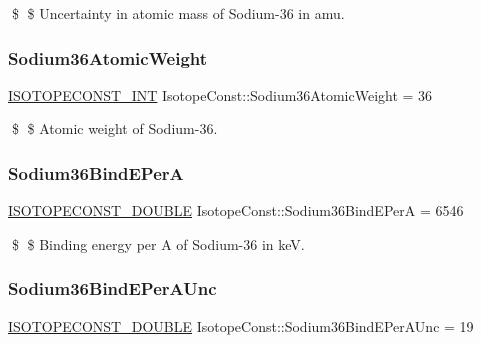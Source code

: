 \$ \$ Uncertainty in atomic mass of Sodium-\/36 in amu. \mbox{\label{group___isotope_const-_sodium-_na36_ga6f922378ca8fc5c8ec384ea5cf5f35aa}} 
\subsubsection{\texorpdfstring{Sodium36\+Atomic\+Weight}{Sodium36AtomicWeight}}
{\footnotesize\ttfamily \mbox{\hyperlink{group___isotope_const-_macros_ga5f18360b3e99483a35c32d789e62621c}{I\+S\+O\+T\+O\+P\+E\+C\+O\+N\+S\+T\+\_\+\+I\+NT}} Isotope\+Const\+::\+Sodium36\+Atomic\+Weight = 36}

\$ \$ Atomic weight of Sodium-\/36. \mbox{\label{group___isotope_const-_sodium-_na36_ga2cf3cb5d5548f279f44f393a9712e6be}} 
\subsubsection{\texorpdfstring{Sodium36\+Bind\+E\+PerA}{Sodium36BindEPerA}}
{\footnotesize\ttfamily \mbox{\hyperlink{group___isotope_const-_macros_ga8f45a7272ce02c0b4c65c44636ed719a}{I\+S\+O\+T\+O\+P\+E\+C\+O\+N\+S\+T\+\_\+\+D\+O\+U\+B\+LE}} Isotope\+Const\+::\+Sodium36\+Bind\+E\+PerA = 6546}

\$ \$ Binding energy per A of Sodium-\/36 in keV. \mbox{\label{group___isotope_const-_sodium-_na36_gae96396cccb244c7accdae3da64a2eeec}} 
\subsubsection{\texorpdfstring{Sodium36\+Bind\+E\+Per\+A\+Unc}{Sodium36BindEPerAUnc}}
{\footnotesize\ttfamily \mbox{\hyperlink{group___isotope_const-_macros_ga8f45a7272ce02c0b4c65c44636ed719a}{I\+S\+O\+T\+O\+P\+E\+C\+O\+N\+S\+T\+\_\+\+D\+O\+U\+B\+LE}} Isotope\+Const\+::\+Sodium36\+Bind\+E\+Per\+A\+Unc = 19}

